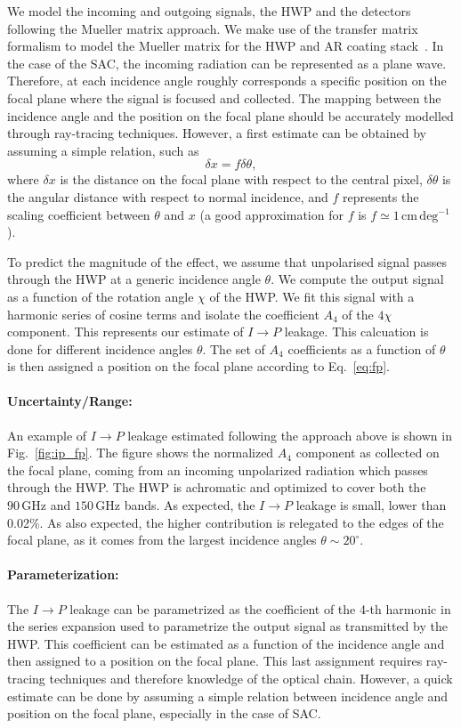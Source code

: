 We model the incoming and outgoing signals, the HWP and the detectors following the Mueller matrix approach. We make use of the transfer matrix formalism to model the Mueller matrix for the HWP and AR coating stack~\cite{Tom_TM}. In the case of the SAC, the incoming radiation can be represented as a plane wave. Therefore, at each incidence angle roughly corresponds a specific position on the focal plane where the signal is focused and collected. The mapping between the incidence angle and the position on the focal plane should be accurately modelled through ray-tracing techniques. However, a first estimate can be obtained by assuming a simple relation, such as 
\begin{equation}\label{eq:fp}
\delta x= f \delta \theta,
\end{equation}
where $\delta x$ is the distance on the focal plane with respect to the central pixel, $\delta \theta$ is the angular distance with respect to normal incidence, and $f$ represents the scaling coefficient between $\theta$ and $x$ (a good approximation for $f$ is $f\simeq 1\,\mathrm{cm\,deg^{-1}}$).

To predict the magnitude of the effect, we assume that unpolarised signal passes through the HWP at a generic incidence angle $\theta$. We compute the output signal as a function of the rotation angle $\chi$ of the HWP. We fit this signal with a harmonic series of cosine terms and isolate the coefficient $A_4$ of the $4\chi$ component. This represents our estimate of $I\rightarrow P$ leakage. This calcuation is done for different incidence angles $\theta$. The set of $A_4$ coefficients as a function of $\theta$ is then assigned a position on the focal plane according to Eq.~\ref{eq:fp}.

\paragraph{Uncertainty/Range:}
An example of $I\rightarrow P$ leakage estimated following the approach above is shown in Fig.~\ref{fig:ip_fp}. The figure shows the normalized $A_4$ component as collected on the focal plane, coming from an incoming unpolarized radiation which passes through the HWP. The HWP is achromatic and optimized to cover both the $90\,\mathrm{GHz}$ and $150\,\mathrm{GHz}$ bands. As expected, the $I\rightarrow P$ leakage is small, lower than 0.02\%. As also expected, the higher contribution is relegated to the edges of the focal plane, as it comes from the largest incidence angles $\theta\sim 20^\circ$.

\paragraph{Parameterization:}
The $I\rightarrow P$ leakage can be parametrized as the coefficient of the 4-th harmonic in the series expansion used to parametrize the output signal as transmitted by the HWP. This coefficient can be estimated as a function of the incidence angle and then assigned to a position on the focal plane. This last assignment requires ray-tracing techniques and therefore knowledge of the optical chain. However, a quick estimate can be done by assuming a simple relation between incidence angle and position on the focal plane, especially in the case of SAC.
